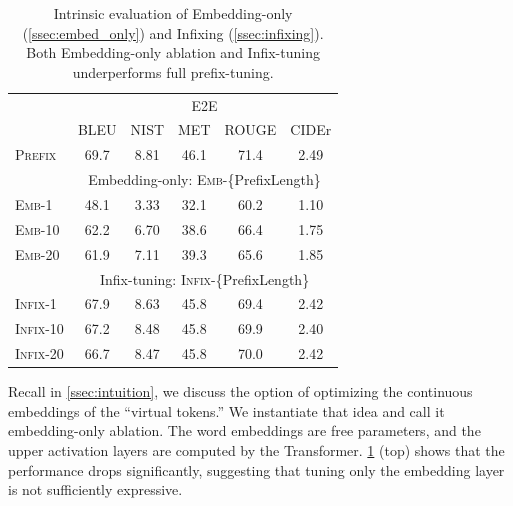 \documentclass[11pt,a4paper]{article}
\newcommand{\exper}[1]{\textsc{#1}}
\newcommand{\prefix}{\exper{Prefix}}
\newcommand{\Emb}{\exper{Emb}}
\newcommand{\infix}{\exper{Infix}}
\newcommand\pl[1]{\textcolor{red}{[PL: #1]}}
\newcommand\lisa[1]{\textcolor{blue}{[Lisa: #1]}}
\begin{document}
\begin{table}[]
\centering
\small
\begin{tabular}{lccccc}
\toprule
& \multicolumn{5}{c}{E2E}\\
         & BLEU  & NIST & MET & ROUGE & CIDEr \\
\midrule
\midrule
\prefix &  69.7 & 8.81 & 46.1  & 71.4  & 2.49  \\
\midrule
& \multicolumn{5}{c}{Embedding-only: \Emb-\{PrefixLength\}}\\
\Emb-1 & 48.1 & 3.33 & 32.1 & 60.2 & 1.10 \\ 
\Emb-10 & 62.2 & 6.70 & 38.6& 66.4 & 1.75 \\ 
\Emb-20 & 61.9 & 7.11 & 39.3 & 65.6 & 1.85 \\ 
\midrule
& \multicolumn{5}{c}{Infix-tuning: \infix-\{PrefixLength\}}\\
\infix-1 &  67.9 & 8.63 & 45.8 & 69.4 & 2.42 \\
\infix-10 &  67.2 & 8.48 & 45.8 & 69.9 & 2.40 \\
\infix-20 & 66.7  & 8.47& 45.8 & 70.0 & 2.42\\
\bottomrule
\end{tabular}
\caption{\label{tab:ablation} Intrinsic evaluation of Embedding-only (\cref{ssec:embed_only}) and Infixing (\cref{ssec:infixing}). Both Embedding-only ablation and Infix-tuning underperforms full prefix-tuning.}
\end{table}
Recall in \cref{ssec:intuition}, we discuss the option of optimizing the continuous embeddings of the ``virtual tokens.'' We instantiate that idea and call it embedding-only ablation. The word embeddings are free parameters, and the upper activation layers are computed by the Transformer. \cref{tab:ablation} (top) shows that the performance drops significantly, suggesting that tuning only the embedding layer is not sufficiently expressive. 
\end{document}
